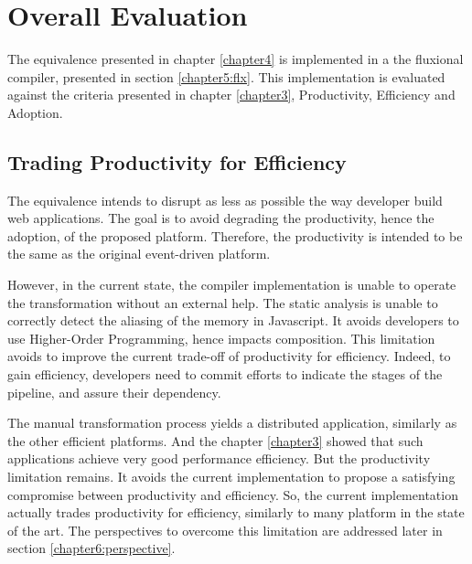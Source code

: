 \section{Overall Evaluation} \label{chapter6:evaluation}

The equivalence presented in chapter \ref{chapter4} is implemented in a the fluxional compiler, presented in section \ref{chapter5:flx}.
This implementation is evaluated against the criteria presented in chapter \ref{chapter3}, Productivity, Efficiency and Adoption.

\subsection{Trading Productivity for Efficiency}


The equivalence intends to disrupt as less as possible the way developer build web applications.
The goal is to avoid degrading the productivity, hence the adoption, of the proposed platform.
Therefore, the productivity is intended to be the same as the original event-driven platform.

However, in the current state, the compiler implementation is unable to operate the transformation without an external help.
The static analysis is unable to correctly detect the aliasing of the memory in Javascript.
It avoids developers to use Higher-Order Programming, hence impacts composition.
This limitation avoids to improve the current trade-off of productivity for efficiency. %
Indeed, to gain efficiency, developers need to commit efforts to indicate the stages of the pipeline, and assure their dependency.


The manual transformation process yields a distributed application, similarly as the other efficient platforms.
And the chapter \ref{chapter3} showed that such applications achieve very good performance efficiency.
But the productivity limitation remains.
It avoids the current implementation to propose a satisfying compromise between productivity and efficiency.
So, the current implementation actually trades productivity for efficiency, similarly to many platform in the state of the art. %
The perspectives to overcome this limitation are addressed later in section \ref{chapter6:perspective}.


